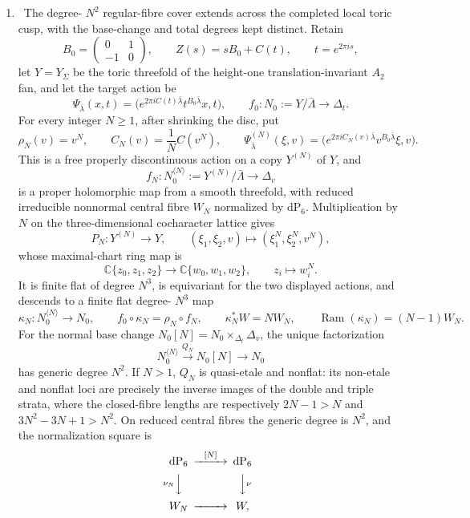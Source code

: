 \begin{enumerate}[leftmargin=1.8em]
\item \Verified\ The degree-
\(N^2\) regular-fibre cover extends across the completed local toric cusp,
with the base-change and total degrees kept distinct.  Retain
\[
 B_0=\begin{pmatrix}0&1\\-1&0\end{pmatrix},\qquad
 Z(s)=sB_0+C(t),\qquad t=e^{2\pi i s},
\]
let \(Y=Y_\Sigma\) be the toric threefold of the height-one
translation-invariant \(A_2\) fan, and let the target action be
\[
 \Psi_{\bar\lambda}(x,t)
 =\bigl(e^{2\pi iC(t)\bar\lambda}
        t^{B_0\bar\lambda}x,t\bigr),\qquad
 f_0:N_0:=Y/\bar\Lambda\longrightarrow\Delta_t.
\]
For every integer \(N\ge1\), after shrinking the disc, put
\[
 \rho_N(v)=v^N,\qquad
 C_N(v)=\frac1N C(v^N),\qquad
 \Psi^{(N)}_{\bar\lambda}(\xi,v)
 =\bigl(e^{2\pi iC_N(v)\bar\lambda}
        v^{B_0\bar\lambda}\xi,v\bigr).
\]
This is a free properly discontinuous action on a copy \(Y^{(N)}\) of
\(Y\), and
\[
 f_N:N_0^{\langle N\rangle}:=Y^{(N)}/\bar\Lambda
 \longrightarrow\Delta_v
\]
is a proper holomorphic map from a smooth threefold, with reduced
irreducible nonnormal central fibre \(W_N\) normalized by
\(\mathrm{dP}_6\).  Multiplication by
\(N\) on the three-dimensional cocharacter lattice gives
\[
 P_N:Y^{(N)}\longrightarrow Y,\qquad
 (\xi_1,\xi_2,v)\longmapsto(\xi_1^N,\xi_2^N,v^N),
\]
whose maximal-chart ring map is
\[
 \mathbb C\{z_0,z_1,z_2\}\longrightarrow
 \mathbb C\{w_0,w_1,w_2\},\qquad z_i\longmapsto w_i^N.
\]
It is finite flat of degree \(N^3\), is equivariant for the two displayed
actions, and descends to a finite flat degree-
\(N^3\) map
\[
 \kappa_N:N_0^{\langle N\rangle}\longrightarrow N_0,\qquad
 f_0\circ\kappa_N=\rho_N\circ f_N,\qquad
 \kappa_N^*W=NW_N,\qquad
 \operatorname{Ram}(\kappa_N)=(N-1)W_N.
\]
For the normal base change
\(N_0[N]=N_0\times_{\Delta_t}\Delta_v\), the unique factorization
\[
 N_0^{\langle N\rangle}\xrightarrow{Q_N}N_0[N]\longrightarrow N_0
\]
has generic degree \(N^2\).  If \(N>1\), \(Q_N\) is quasi-etale and
nonflat: its non-etale and nonflat loci are precisely the inverse images of
the double and triple strata, where the closed-fibre lengths are respectively
\(2N-1>N\) and \(3N^2-3N+1>N^2\).  On reduced central fibres the generic
degree is \(N^2\), and the normalization square is
\[
\begin{CD}
 \mathrm{dP}_6 @>{[N]}>> \mathrm{dP}_6\\
 @V{\nu_N}VV @VV{\nu}V\\
 W_N @>>> W,
\end{CD}
\]
\end{enumerate}
